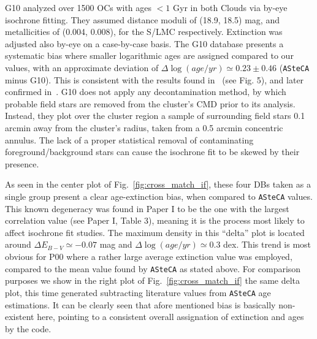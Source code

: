 \documentclass{aa}
\begin{document}
G10 analyzed over 1500 OCs with ages ${<}1$ Gyr in both Clouds via by-eye isochrone
fitting. They assumed distance moduli of (18.9, 18.5) mag, and metallicities of
(0.004, 0.008), for the S/LMC respectively. Extinction was adjusted also by-eye
on a case-by-case basis.
The G10 database presents a systematic bias where smaller logarithmic ages are
assigned compared to our values, with an approximate deviation of $\Delta
\log(age/yr){\simeq}0.23\pm0.46$ (\texttt{ASteCA} minus G10). This is consistent
with the results found in~\cite{Choudhury_2015} (see Fig. 5), and later
confirmed in~\cite{Piatti_2015a,Piatti_2015b}.
%
G10 does not apply any decontamination method, by which probable field stars are
removed from the cluster's CMD prior to its analysis. Instead, they plot over
the cluster region a sample of surrounding field stars 0.1 arcmin away from the
cluster's radius, taken from a 0.5 arcmin concentric annulus. The lack of a
proper statistical removal of contaminating foreground/background stars can
cause the isochrone fit to be skewed by their presence.

%
As seen in the center plot of Fig.~\ref{fig:cross_match_if}, these four DBs
taken as a single group present a clear age-extinction bias, when compared
to \texttt{ASteCA} values. This known degeneracy was found in Paper I to be
the one with the largest correlation value (see Paper I, Table 3), meaning it is
the process most likely to affect isochrone fit studies.
The maximum density in this ``delta'' plot is located around
$\Delta E_{B-V}{\simeq-}0.07$ mag and $\Delta \log(age/yr){\simeq}0.3$ dex.
This trend is most obvious for P00 where a rather large average extinction
value was employed, compared to the mean value found by \texttt{ASteCA} as
stated above.
%
For comparison purposes we show in the right plot of
Fig.~\ref{fig:cross_match_if} the same delta plot, this time generated
subtracting literature values from \texttt{ASteCA} age estimations. It can 
be clearly seen that afore mentioned bias is basically non-existent here,
pointing to a consistent overall assignation of extinction and ages by
the code.
\end{document}
